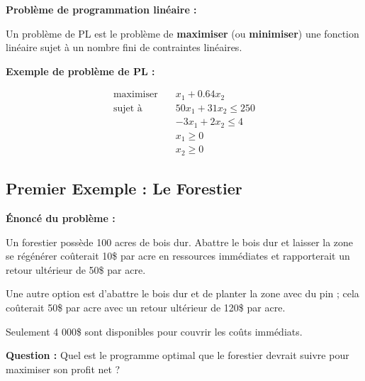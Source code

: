 \documentclass[12pt,a4paper]{article}
\begin{document}
\begin{definition}
\textbf{Problème de programmation linéaire :}

Un problème de PL est le problème de \textcolor{importantrouge}{\textbf{maximiser}} (ou \textcolor{defvert}{\textbf{minimiser}}) une fonction linéaire sujet à un nombre fini de contraintes linéaires.
\end{definition}

\begin{exemple}
\textbf{Exemple de problème de PL :}

\begin{align*}
\text{maximiser} \quad & x_1 + 0.64x_2\\
\text{sujet à} \quad & 50x_1 + 31x_2 \leq 250\\
& -3x_1 + 2x_2 \leq 4\\
& x_1 \geq 0\\
& x_2 \geq 0
\end{align*}
\end{exemple}

\newpage
\subsection{Premier Exemple : Le Forestier}

\begin{exemple}
\textbf{Énoncé du problème :}

Un forestier possède 100 acres de bois dur. Abattre le bois dur et laisser la zone se régénérer coûterait 10\$ par acre en ressources immédiates et rapporterait un retour ultérieur de 50\$ par acre. 

Une autre option est d'abattre le bois dur et de planter la zone avec du pin ; cela coûterait 50\$ par acre avec un retour ultérieur de 120\$ par acre. 

Seulement 4 000\$ sont disponibles pour couvrir les coûts immédiats. 

\textbf{Question :} Quel est le programme optimal que le forestier devrait suivre pour maximiser son profit net ?
\end{exemple}
\end{document}

